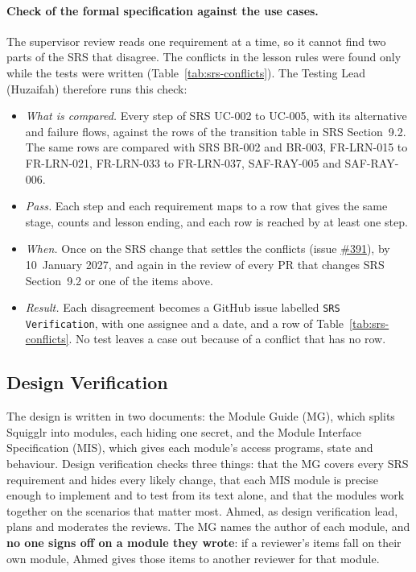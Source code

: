 \documentclass[12pt, titlepage]{article}
\begin{document}
\paragraph{Check of the formal specification against the use cases.} The
supervisor review reads one requirement at a time, so it cannot find two
parts of the SRS that disagree. The conflicts in the lesson rules were found
only while the tests were written (Table~\ref{tab:srs-conflicts}). The
Testing Lead (Huzaifah) therefore runs this check:
\begin{itemize}
\item \emph{What is compared.} Every step of SRS UC-002 to UC-005, with its
alternative and failure flows, against the rows of the transition table in
SRS Section~9.2. The same rows are compared with SRS BR-002 and BR-003,
FR-LRN-015 to FR-LRN-021, FR-LRN-033 to FR-LRN-037, SAF-RAY-005 and
SAF-RAY-006.
\item \emph{Pass.} Each step and each requirement maps to a row that gives
the same stage, counts and lesson ending, and each row is reached by at
least one step.
\item \emph{When.} Once on the SRS change that settles the conflicts (issue
\href{https://github.com/AHMEDELZARIA/squigglr/issues/391}{\#391}), by
10~January 2027, and again in the review of every PR that changes SRS
Section~9.2 or one of the items above.
\item \emph{Result.} Each disagreement becomes a GitHub issue labelled
\texttt{SRS Verification}, with one assignee and a date, and a row of
Table~\ref{tab:srs-conflicts}. No test leaves a case out because of a
conflict that has no row.
\end{itemize}

\subsection{Design Verification}
\label{sec:design-verification}

The design is written in two documents: the Module Guide (MG), which splits
Squigglr into modules, each hiding one secret, and the Module Interface
Specification (MIS), which gives each module's access programs, state and
behaviour. Design verification checks three things: that the MG covers every
SRS requirement and hides every likely change, that each MIS module is
precise enough to implement and to test from its text alone, and that the
modules work together on the scenarios that matter most. Ahmed, as design
verification lead, plans and moderates the reviews. The MG names the author of
each module, and \textbf{no one signs off on a module they wrote}: if a
reviewer's items fall on their own module, Ahmed gives those items to another
reviewer for that module.
\end{document}

